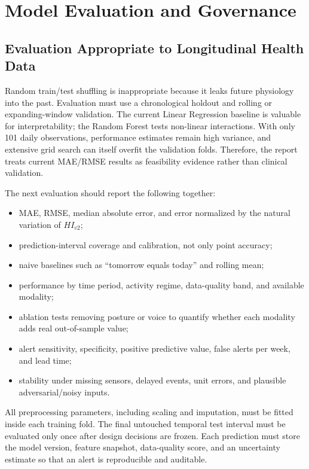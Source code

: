 \documentclass[11pt,a4paper]{article}
\begin{document}
\section{Model Evaluation and Governance}
\subsection{Evaluation Appropriate to Longitudinal Health Data}
Random train/test shuffling is inappropriate because it leaks future physiology into the past. Evaluation must use a chronological holdout and rolling or expanding-window validation. The current Linear Regression baseline is valuable for interpretability; the Random Forest tests non-linear interactions. With only 101 daily observations, performance estimates remain high variance, and extensive grid search can itself overfit the validation folds. Therefore, the report treats current MAE/RMSE results as feasibility evidence rather than clinical validation.

The next evaluation should report the following together:
\begin{itemize}
    \item MAE, RMSE, median absolute error, and error normalized by the natural variation of $HI_{v2}$;
    \item prediction-interval coverage and calibration, not only point accuracy;
    \item naive baselines such as ``tomorrow equals today'' and rolling mean;
    \item performance by time period, activity regime, data-quality band, and available modality;
    \item ablation tests removing posture or voice to quantify whether each modality adds real out-of-sample value;
    \item alert sensitivity, specificity, positive predictive value, false alerts per week, and lead time;
    \item stability under missing sensors, delayed events, unit errors, and plausible adversarial/noisy inputs.
\end{itemize}

All preprocessing parameters, including scaling and imputation, must be fitted inside each training fold. The final untouched temporal test interval must be evaluated only once after design decisions are frozen. Each prediction must store the model version, feature snapshot, data-quality score, and an uncertainty estimate so that an alert is reproducible and auditable.
\end{document}
